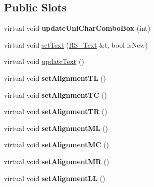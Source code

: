 \subsection*{Public Slots}
\begin{DoxyCompactItemize}
\item 
\hypertarget{classQG__DlgText_a4f25b41a0482fcdb582ee79a4a8a6bad}{virtual void {\bfseries update\-Uni\-Char\-Combo\-Box} (int)}\label{classQG__DlgText_a4f25b41a0482fcdb582ee79a4a8a6bad}

\item 
virtual void \hyperlink{classQG__DlgText_a614b831c85ddb0cf4be6f3ee40172d1e}{set\-Text} (\hyperlink{classRS__Text}{R\-S\-\_\-\-Text} \&t, bool is\-New)
\item 
virtual void \hyperlink{classQG__DlgText_ae9b55bf64f54a8a87bde068db7177307}{update\-Text} ()
\item 
\hypertarget{classQG__DlgText_a37fdf4b7b698814423c7946fe3c84aa2}{virtual void {\bfseries set\-Alignment\-T\-L} ()}\label{classQG__DlgText_a37fdf4b7b698814423c7946fe3c84aa2}

\item 
\hypertarget{classQG__DlgText_a55019e68fbfd41023f377a53253423b6}{virtual void {\bfseries set\-Alignment\-T\-C} ()}\label{classQG__DlgText_a55019e68fbfd41023f377a53253423b6}

\item 
\hypertarget{classQG__DlgText_a31960cb7c98fbd3f78d6eb61e507cc1e}{virtual void {\bfseries set\-Alignment\-T\-R} ()}\label{classQG__DlgText_a31960cb7c98fbd3f78d6eb61e507cc1e}

\item 
\hypertarget{classQG__DlgText_a41a2d77fa6d57326529c18c1799198a6}{virtual void {\bfseries set\-Alignment\-M\-L} ()}\label{classQG__DlgText_a41a2d77fa6d57326529c18c1799198a6}

\item 
\hypertarget{classQG__DlgText_ab15fc626cff4449f679447dc28117f5d}{virtual void {\bfseries set\-Alignment\-M\-C} ()}\label{classQG__DlgText_ab15fc626cff4449f679447dc28117f5d}

\item 
\hypertarget{classQG__DlgText_ab4d9fa7d4f905aad92cd4c77e5849c1b}{virtual void {\bfseries set\-Alignment\-M\-R} ()}\label{classQG__DlgText_ab4d9fa7d4f905aad92cd4c77e5849c1b}

\item 
\hypertarget{classQG__DlgText_a07a56fda17b75f39adfff5e3c59a348b}{virtual void {\bfseries set\-Alignment\-L\-L} ()}\label{classQG__DlgText_a07a56fda17b75f39adfff5e3c59a348b}


\end{DoxyCompactItemize}
